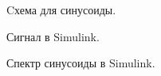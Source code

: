 \documentclass[12pt,a4paper]{scrartcl}
\begin{document}
\begin{figure}[h!]
\caption{Cхема для синусоиды.}
\end{figure}

\begin{figure}[h!]
\caption{Сигнал в Simulink.}
\end{figure}

\begin{figure}[h!]
\caption{Спектр синусоиды в Simulink.}
\end{figure}
\end{document}
